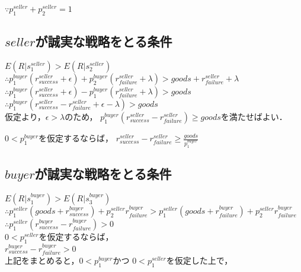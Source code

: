 $ \because p^{seller}_1 + p^{seller}_2 = 1 $ \\


\subsection{$ seller $が誠実な戦略をとる条件}

$ E(R|s^{seller}_1) > E(R|s^{seller}_2) $ \\

$ \therefore p^{buyer}_1 (r^{seller}_{success} + \epsilon) + p^{buyer}_2 (r^{seller}_{failure} + \lambda) > goods + r^{seller}_{failure} + \lambda $ \\

$ \therefore p^{buyer}_1(r^{seller}_{success} + \epsilon) - p^{buyer}_1(r^{seller}_{failure} + \lambda) > goods $ \\

$ \therefore p^{buyer}_1(r^{seller}_{success} - r^{seller}_{failure} + \epsilon - \lambda) > goods $ \\

仮定より，$ \epsilon > \lambda $のため，
$ p^{buyer}_1 (r^{seller}_{success} - r^{seller}_{failure}) \geq goods $を満たせばよい．

$ 0 < p^{buyer}_1 $を仮定するならば，
$ r^{seller}_{success} - r^{seller}_{failure} \geq \frac{goods}{p^{buyer}_1} $


\subsection{$ buyer $が誠実な戦略をとる条件}

$ E(R|s^{buyer}_1) > E(R|s^{buyer}_3) $ \\

$ \therefore p^{seller}_1 (goods + r^{buyer}_{success}) + p^{seller}_2 r^{buyer}_{failure} > p^{seller}_1(goods+r^{buyer}_{failure}) + p^{seller}_2 r^{buyer}_{failure} $ \\

$ \therefore p^{seller}_1(r^{buyer}_{success} - r^{buyer}_{failure}) > 0 $ \\

$ 0 < p^{seller}_1 $を仮定するならば， \\

$ r^{buyer}_{success} - r^{buyer}_{failure} > 0 $ \\

上記をまとめると，$ 0<p^{buyer}_1 $かつ $ 0 < p^{seller}_{1} $を仮定した上で，\\

